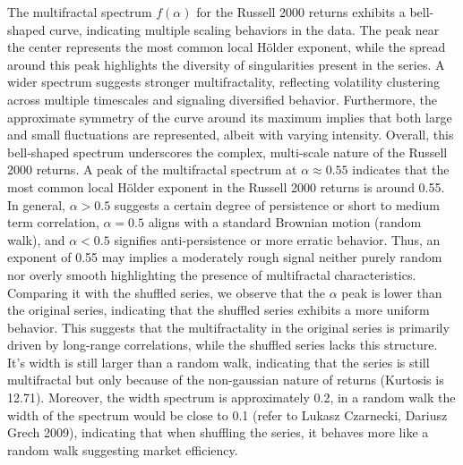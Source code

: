 \documentclass[11pt]{extarticle}
\begin{document}
The multifractal spectrum $f(\alpha)$ for the Russell 2000 returns exhibits a bell-shaped curve,
indicating multiple scaling behaviors in the data. The peak near the center represents the most common local Hölder
exponent, while the spread around this peak highlights the diversity of singularities present in the series. A wider
spectrum suggests stronger multifractality, reflecting volatility clustering across multiple timescales and signaling diversified
behavior. Furthermore,
the approximate symmetry of the curve around its maximum implies that both large and small fluctuations are represented,
albeit with varying intensity. Overall, this bell-shaped spectrum underscores the complex, multi-scale nature of the
Russell 2000 returns.
A peak of the multifractal spectrum at $\alpha \approx 0.55$ indicates that the most common local Hölder exponent
in the Russell 2000 returns is around 0.55. In general, $\alpha > 0.5$ suggests a certain degree of persistence or
short to medium term correlation, $\alpha = 0.5$ aligns with a standard Brownian motion (random walk),
and $\alpha < 0.5$ signifies anti-persistence or more erratic behavior. Thus, an exponent of 0.55 may implies a
moderately rough signal neither purely random nor overly smooth highlighting the presence of multifractal characteristics.
Comparing it with the shuffled series, we observe that the $\alpha$ peak is lower than the original series, indicating that the
shuffled series exhibits a more uniform behavior. This suggests that the multifractality in the original series is primarily
driven by long-range correlations, while the shuffled series lacks this structure. It's width is still larger than a random walk, indicating
that the series is still multifractal but only because of the non-gaussian nature of returns (Kurtosis is 12.71). Moreover, the width spectrum
is approximately 0.2, in a random walk the width of the spectrum would be close to 0.1 (refer to Lukasz Czarnecki, Dariusz Grech 2009),
indicating that when shuffling the series, it behaves more like a random walk suggesting market efficiency.
\end{document}

